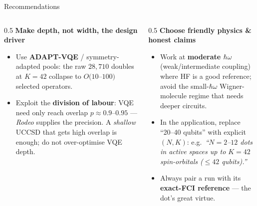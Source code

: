 \documentclass[aspectratio=169,11pt]{beamer}
\begin{document}
\begin{frame}{Recommendations}
\begin{columns}[T]
\begin{column}{0.5\textwidth}
\textbf{Make depth, not width, the design driver}
\begin{itemize}\small
  \item Use \textbf{ADAPT-VQE} / symmetry-adapted pools: the raw $28{,}710$ doubles at
        $K{=}42$ collapse to $O(10$--$100)$ selected operators.
  \item Exploit the \textbf{division of labour}: VQE need only reach overlap
        $p\!\approx\!0.9$--$0.95$ --- \emph{Rodeo} supplies the precision. A \emph{shallow}
        UCCSD that gets high overlap is enough; do not over-optimise VQE depth.
\end{itemize}
\end{column}
\begin{column}{0.5\textwidth}
\textbf{Choose friendly physics \& honest claims}
\begin{itemize}\small
  \item Work at \textbf{moderate $\hbar\omega$} (weak/intermediate coupling) where HF is a
        good reference; avoid the small-$\hbar\omega$ Wigner-molecule regime that needs deeper circuits.
  \item In the application, replace ``20--40 qubits'' with explicit $(N,K)$:
        e.g.\ \emph{``$N{=}2$--$12$ dots in active spaces up to $K{=}42$ spin-orbitals
        ($\le 42$ qubits).''}
  \item Always pair a run with its \textbf{exact-FCI reference} --- the dot's great virtue.
\end{itemize}
\end{column}
\end{columns}
\end{frame}
\end{document}
